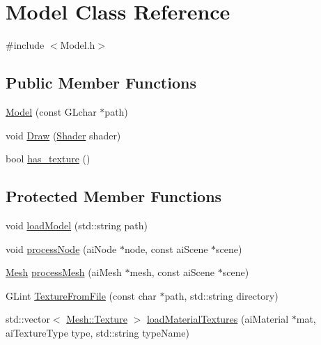 \hypertarget{classModel}{}\section{Model Class Reference}
\label{classModel}


{\ttfamily \#include $<$Model.\+h$>$}

\subsection*{Public Member Functions}
\begin{DoxyCompactItemize}
\item 
\mbox{\hyperlink{classModel_a97ced90b9b512521b2e5bdeaeac6b907}{Model}} (const G\+Lchar $\ast$path)
\item 
void \mbox{\hyperlink{classModel_a191a00d937b9e911bf4881ea14d79b6c}{Draw}} (\mbox{\hyperlink{classShader}{Shader}} shader)
\item 
bool \mbox{\hyperlink{classModel_ad4fd21aa8d404f371ea754f5a117e9fb}{has\+\_\+texture}} ()
\end{DoxyCompactItemize}
\subsection*{Protected Member Functions}
\begin{DoxyCompactItemize}
\item 
void \mbox{\hyperlink{classModel_a3cd88224a93dc81a8503d42be807eb86}{load\+Model}} (std\+::string path)
\item 
void \mbox{\hyperlink{classModel_a23b167ce0d33f7e6ab5693cd5e81a9a5}{process\+Node}} (ai\+Node $\ast$node, const ai\+Scene $\ast$scene)
\item 
\mbox{\hyperlink{classMesh}{Mesh}} \mbox{\hyperlink{classModel_a95ae1a9980ded3d98b1c8785cb889d96}{process\+Mesh}} (ai\+Mesh $\ast$mesh, const ai\+Scene $\ast$scene)
\item 
G\+Lint \mbox{\hyperlink{classModel_a4633dd862f3066d920c2c4177a30310e}{Texture\+From\+File}} (const char $\ast$path, std\+::string directory)
\item 
std\+::vector$<$ \mbox{\hyperlink{structMesh_1_1Texture}{Mesh\+::\+Texture}} $>$ \mbox{\hyperlink{classModel_aa7d0215f3ee74bef71ddeef173dd36dd}{load\+Material\+Textures}} (ai\+Material $\ast$mat, ai\+Texture\+Type type, std\+::string type\+Name)
\end{DoxyCompactItemize}
